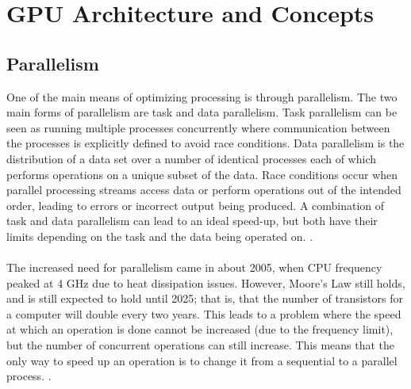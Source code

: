 \section{GPU Architecture and Concepts}\label{gpu}
\subsection{Parallelism}\label{gpu:sec:par}
One of the main means of optimizing processing is through parallelism. The two main forms of parallelism are task and data parallelism. Task parallelism can be seen as running multiple processes concurrently where communication between the processes is explicitly defined to avoid race conditions. Data parallelism is the distribution of a data set over a number of identical processes each of which performs operations on a unique subset of the data. Race conditions occur when parallel processing streams access data or perform operations out of the intended order, leading to errors or incorrect output being produced. A combination of task and data parallelism can lead to an ideal speed-up, but both have their limits depending on the task and the data being operated on. \cite{subhlok1993exploiting}.
\\
\\
The increased need for parallelism came in about 2005, when CPU frequency peaked at 4 GHz due to heat dissipation issues. However, Moore's Law still holds, and is still expected to hold until 2025; that is, that the number of transistors for a computer will double every two years. This leads to a problem where the speed at which an operation is done cannot be increased (due to the frequency limit), but the number of concurrent operations can still increase. This means that the only way to speed up an operation is to change it from a sequential to a parallel process. \cite{rajan2013informatics}.
